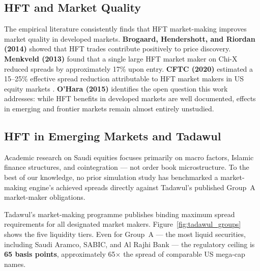 \documentclass[12pt]{article}
\begin{document}
\subsection{HFT and Market Quality}

The empirical literature consistently finds that HFT market-making improves
market quality in developed markets. \textbf{Brogaard, Hendershott, and
Riordan (2014)} \cite{brogaard2014} showed that HFT trades contribute
positively to price discovery. \textbf{Menkveld (2013)} \cite{menkveld2013}
found that a single large HFT market maker on Chi-X reduced spreads by
approximately 17\% upon entry. \textbf{CFTC (2020)} \cite{cftc2020}
estimated a 15--25\% effective spread reduction attributable to HFT market
makers in US equity markets \cite{jones2013}. \textbf{O'Hara (2015)}
\cite{ohara2015} identifies the open question this work addresses: while
HFT benefits in developed markets are well documented, effects in emerging
and frontier markets remain almost entirely unstudied.

\subsection{HFT in Emerging Markets and Tadawul}

Academic research on Saudi equities focuses primarily on macro factors,
Islamic finance structures, and cointegration --- not order book
microstructure. To the best of our knowledge, no prior simulation study
has benchmarked a market-making engine's achieved spreads directly against
Tadawul's published Group~A market-maker obligations.

Tadawul's market-making programme publishes binding maximum spread
requirements for all designated market makers. Figure~\ref{fig:tadawul_groups}
shows the five liquidity tiers. Even for Group~A --- the most liquid
securities, including Saudi Aramco, SABIC, and Al Rajhi Bank --- the
regulatory ceiling is \textbf{65 basis points}, approximately 65$\times$
the spread of comparable US mega-cap names.
\end{document}
